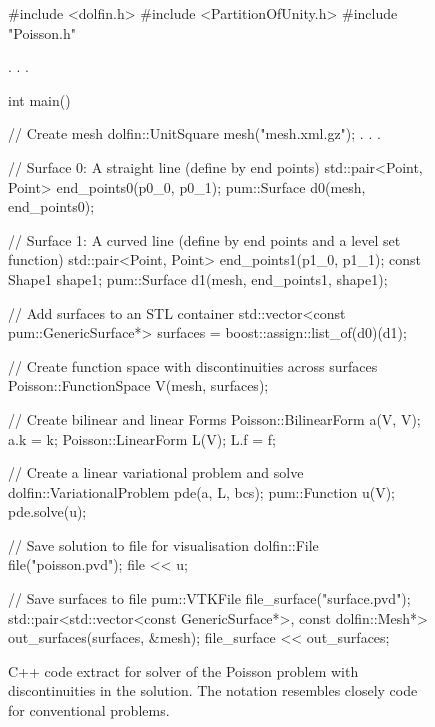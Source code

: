 \begin{figure}
\begin{c++}
#include <dolfin.h>
#include <PartitionOfUnity.h>
#include "Poisson.h"

  . . .

int main()
{
  // Create mesh
  dolfin::UnitSquare mesh("mesh.xml.gz");
  . . .

  // Surface 0: A straight line (define by end points)
  std::pair<Point, Point> end_points0(p0_0, p0_1);
  pum::Surface d0(mesh, end_points0);

  // Surface 1: A curved line (define by end points and a level set function)
  std::pair<Point, Point> end_points1(p1_0, p1_1);
  const Shape1 shape1;
  pum::Surface d1(mesh, end_points1, shape1);

  // Add surfaces to an STL container
  std::vector<const pum::GenericSurface*>
       surfaces = boost::assign::list_of(d0)(d1);

  // Create function space with discontinuities across surfaces
  Poisson::FunctionSpace V(mesh, surfaces);

  // Create bilinear and linear Forms
  Poisson::BilinearForm a(V, V);
  a.k = k;
  Poisson::LinearForm L(V);
  L.f = f;

  // Create a linear variational problem and solve
  dolfin::VariationalProblem pde(a, L, bcs);
  pum::Function u(V);
  pde.solve(u);

  // Save solution to file for visualisation
  dolfin::File file("poisson.pvd");
  file  << u;

  // Save surfaces to file
  pum::VTKFile file_surface("surface.pvd");
  std::pair<std::vector<const GenericSurface*>,
            const dolfin::Mesh*> out_surfaces(surfaces, &mesh);
  file_surface << out_surfaces;
}
\end{c++}
\caption{C++ code extract for solver of the Poisson problem with
discontinuities in the solution. The notation resembles closely \dolfin{}
code for conventional problems.}
\label{fig:nikbakht:poisson_c++}
\end{figure}

